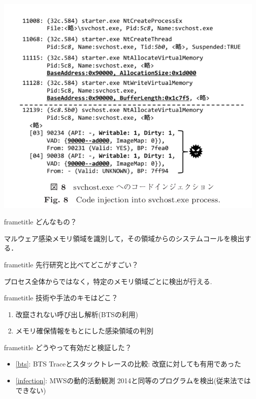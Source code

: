 \begin{frame}[plain,t]
\begin{minipage}[t]{\linewidth}
      \includegraphics[height=0.15\textheight,keepaspectratio]{img/Result.png}
  \end{minipage}

  \begin{multicols}{2}
    \begin{beamercolorbox}[rounded=true, center, shadow=true,wd=\linewidth]{frametitle}
      どんなもの？
    \end{beamercolorbox}
    マルウェア感染メモリ領域を識別して，その領域からのシステムコールを検出する．
    
    \vfill
    \begin{beamercolorbox}[rounded=true, center, shadow=true,wd=\linewidth]{frametitle}
      先行研究と比べてどこがすごい？
    \end{beamercolorbox}
    プロセス全体からではなく，特定のメモリ領域ごとに検出が行える.

    \vfill
    \begin{beamercolorbox}[rounded=true, center, shadow=true,wd=\linewidth]{frametitle}
      技術や手法のキモはどこ？
    \end{beamercolorbox}
    \begin{enumerate}
      \item 改竄されない呼び出し解析(BTSの利用) \label{bts}
      \item メモリ確保情報をもとにした感染領域の判別 \label{infection}
    \end{enumerate}

    \newpage
    \begin{beamercolorbox}[rounded=true, center, shadow=true,wd=\linewidth]{frametitle}
      どうやって有効だと検証した？
    \end{beamercolorbox}
    \begin{itemize}
      \item \ref{bts}: BTS Traceとスタックトレースの比較: 改竄に対しても有用であった
      \item \ref{infection}: MWSの動的活動観測 2014と同等のプログラムを検出(従来法ではできない)
    \end{itemize}


\end{multicols}
\end{frame}
